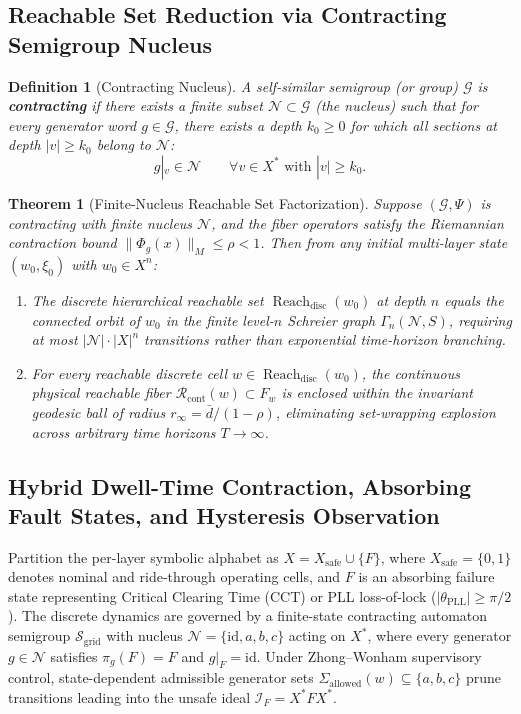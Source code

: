 \documentclass[journal]{IEEEtran}
\newtheorem{theorem}{Theorem}
\newtheorem{definition}{Definition}
\begin{document}
\subsection{Reachable Set Reduction via Contracting Semigroup Nucleus}
\begin{definition}[Contracting Nucleus]
A self-similar semigroup (or group) $\mathcal{G}$ is \textbf{contracting} if there exists a finite subset $\mathcal{N} \subset \mathcal{G}$ (the \emph{nucleus}) such that for every generator word $g \in \mathcal{G}$, there exists a depth $k_0 \ge 0$ for which all sections at depth $|v| \ge k_0$ belong to $\mathcal{N}$:
\begin{equation}
g|_v \in \mathcal{N} \qquad \forall v \in X^* \text{ with } |v| \ge k_0.
\end{equation}
\end{definition}

\begin{theorem}[Finite-Nucleus Reachable Set Factorization]
Suppose $(\mathcal{G}, \Psi)$ is contracting with finite nucleus $\mathcal{N}$, and the fiber operators satisfy the Riemannian contraction bound $\|\Phi_g(x)\|_{M} \le \rho < 1$. Then from any initial multi-layer state $(w_0, \xi_0)$ with $w_0 \in X^n$:
\begin{enumerate}
    \item The discrete hierarchical reachable set $\operatorname{Reach}_{\text{disc}}(w_0)$ at depth $n$ equals the connected orbit of $w_0$ in the finite level-$n$ Schreier graph $\Gamma_n(\mathcal{N}, S)$, requiring at most $|\mathcal{N}| \cdot |X|^n$ transitions rather than exponential time-horizon branching.
    \item For every reachable discrete cell $w \in \operatorname{Reach}_{\text{disc}}(w_0)$, the continuous physical reachable fiber $\mathcal{R}_{\text{cont}}(w) \subset F_w$ is enclosed within the invariant geodesic ball of radius $r_\infty = \bar{d}/(1 - \rho)$, eliminating set-wrapping explosion across arbitrary time horizons $T \to \infty$.
\end{enumerate}
\end{theorem}

\subsection{Hybrid Dwell-Time Contraction, Absorbing Fault States, and Hysteresis Observation}
Partition the per-layer symbolic alphabet as $X = X_{\text{safe}} \cup \{F\}$, where $X_{\text{safe}} = \{0, 1\}$ denotes nominal and ride-through operating cells, and $F$ is an absorbing failure state representing Critical Clearing Time (CCT) or PLL loss-of-lock ($|\theta_{\text{PLL}}| \ge \pi/2$). The discrete dynamics are governed by a finite-state contracting automaton semigroup $\mathcal{S}_{\text{grid}}$ with nucleus $\mathcal{N} = \{\mathrm{id}, a, b, c\}$ acting on $X^*$, where every generator $g \in \mathcal{N}$ satisfies $\pi_g(F) = F$ and $g|_F = \mathrm{id}$. Under Zhong--Wonham supervisory control, state-dependent admissible generator sets $\Sigma_{\text{allowed}}(w) \subseteq \{a, b, c\}$ prune transitions leading into the unsafe ideal $\mathcal{I}_F = X^* F X^*$.
\end{document}
